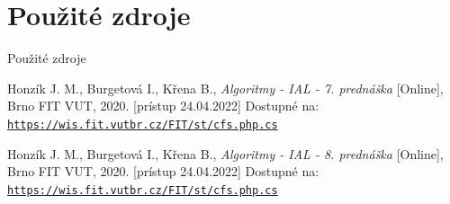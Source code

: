 \documentclass{beamer}
\begin{document}
\section{Použité zdroje}
\begin{frame}{Použité zdroje}
  \begin{thebibliography}{9}
    Honzík J. M., Burgetová I., Křena B., \emph{Algoritmy - IAL - 7. prednáška} [Online], Brno FIT VUT, 2020. [prístup 24.04.2022] Dostupné na: \href{https://wis.fit.vutbr.cz/FIT/st/cfs.php.cs?file=\%2Fcourse\%2FIAL-IT\%2Flectures\%2FPred-07_2021_final.pdf&cid=14603}{\texttt{https://wis.fit.vutbr.cz/FIT/st/cfs.php.cs}}
    
    Honzík J. M., Burgetová I., Křena B., \emph{Algoritmy - IAL - 8. prednáška} [Online], Brno FIT VUT, 2020. [prístup 24.04.2022] Dostupné na: \href{https://wis.fit.vutbr.cz/FIT/st/cfs.php.cs?file=\%2Fcourse\%2FIAL-IT\%2Flectures\%2FPred-08_2021_final.pdf&cid=14603}{\texttt{https://wis.fit.vutbr.cz/FIT/st/cfs.php.cs}}

\end{thebibliography}
\end{frame}
\end{document}
